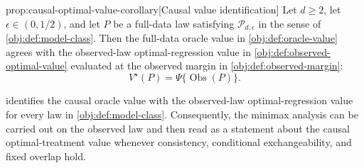 \begin{propositionv}{prop:causal-optimal-value-corollary}[Causal value identification]
Let \(d\ge 2\), let \(\epsilon\in(0,1/2)\), and let \(P\) be a full-data law satisfying \(\mathcal P_{d,\epsilon}\) in the sense of \cref{obj:def:model-class}. Then the full-data oracle value in \cref{obj:def:oracle-value} agrees with the observed-law optimal-regression value in \cref{obj:def:observed-optimal-value} evaluated at the observed margin in \cref{obj:def:observed-margin}:
\[
V^\star(P)=\Psi\{\operatorname{Obs}(P)\}.
\]
\end{propositionv}

 identifies the causal oracle value with the observed-law optimal-regression value for every law in \cref{obj:def:model-class}. Consequently, the minimax analysis can be carried out on the observed law and then read as a statement about the causal optimal-treatment value whenever consistency, conditional exchangeability, and fixed overlap hold.

